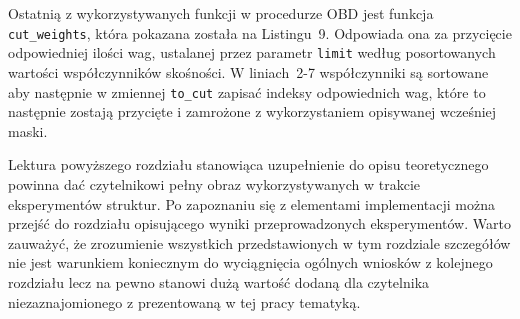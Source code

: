 \par Ostatnią z wykorzystywanych funkcji w procedurze OBD jest funkcja \texttt{cut{\_}weights}, która pokazana została na Listingu~9. Odpowiada ona za przycięcie odpowiedniej ilości wag, ustalanej przez parametr \texttt{limit} według posortowanych wartości współczynników skośności. W liniach~2-7 współczynniki są sortowane aby następnie w zmiennej \texttt{to{\_}cut} zapisać indeksy odpowiednich wag, które to następnie zostają przycięte i zamrożone z wykorzystaniem opisywanej wcześniej maski.
\par Lektura powyższego rozdziału stanowiąca uzupełnienie do opisu teoretycznego powinna dać czytelnikowi pełny obraz wykorzystywanych w trakcie eksperymentów struktur. Po zapoznaniu się z elementami implementacji można przejść do rozdziału opisującego wyniki przeprowadzonych eksperymentów. Warto zauważyć, że zrozumienie wszystkich przedstawionych w tym rozdziale szczegółów nie jest warunkiem koniecznym do wyciągnięcia ogólnych wniosków z kolejnego rozdziału lecz na pewno stanowi dużą wartość dodaną dla czytelnika niezaznajomionego z prezentowaną w tej pracy tematyką.